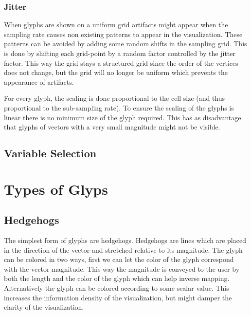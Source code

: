 
\subsubsection{Jitter} %
\label{ssub:jitter}
When glyphs are shown on a uniform grid artifacts might appear when the sampling rate causes non existing patterns to appear in the visualization. These patterns can be avoided by adding some random shifts in the sampling grid. This is done by shifting each grid-point by a random factor controlled by the jitter factor. This way the grid stays a structured grid since the order of the vertices does not change, but the grid will no longer be uniform which prevents the appearance of artifacts.


For every glyph, the scaling is done proportional to the cell size (and thus proportional to the sub-sampling rate). To ensure the scaling of the glyphs is linear there is no minimum size of the glyph required. This has as disadvantage that glyphs of vectors with a very small magnitude might not be visible.
\subsection{Variable Selection} %
\label{sub:variable_selection}


\section{Types of Glyps} %
\label{sec:types_of_glyps}

\subsection{Hedgehogs} %
\label{sub:hedgehogs}
The simplest form of glyphs are hedgehogs. Hedgehogs are lines which are placed in the direction of the vector and stretched relative to its magnitude. The glyph can be colored in two ways, first we can let the color of the glyph correspond with the vector magnitude. This way the magnitude is conveyed to the user by both the length and the color of the glyph which can help inverse mapping. Alternatively the glyph can be colored according to some scalar value. This increases the information density of the visualization, but might damper the clarity of the visualization.

